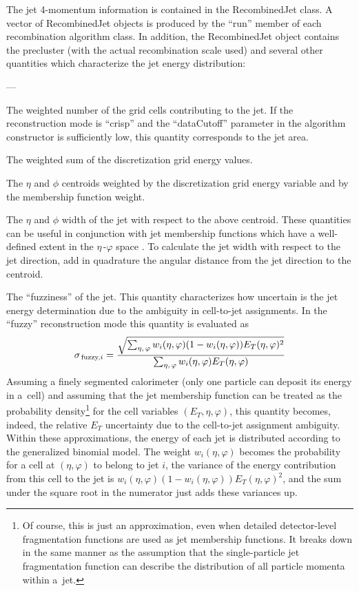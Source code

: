 \documentclass[epsf,12pt,titlepage]{article}
\newcommand{\sub}[1]{\ensuremath{_{\mbox{\scriptsize \,#1}}}}
\def\epspace {$\eta$\,-$\varphi$ space }
\newcommand{\cname}[1]{\index{#1}\textsf{#1}}
\newenvironment{thinlist} {
    \begin{list} {---} {
        \setlength{\topsep}{0.075cm}
        \setlength{\parsep}{0.075cm}
        \setlength{\itemsep}{0.075cm}
    }
} {\end{list}}
\begin{document}
The jet 4-momentum information is contained in the
\cname{RecombinedJet} class. A vector of \cname{RecombinedJet}
objects is produced by the ``run'' member of each recombination
algorithm class. In addition, the \cname{RecombinedJet} object contains
the precluster (with the actual recombination scale used) and
several other quantities which characterize the jet energy
distribution:
\begin{thinlist}
\item The weighted number of the grid cells contributing to the jet. 
      If the reconstruction mode is ``crisp'' and the ``dataCutoff''
      parameter in the algorithm constructor is sufficiently low,
      this quantity corresponds to the jet area.
\item The weighted sum of the discretization grid energy values.
\item The $\eta$ and $\phi$ centroids weighted by the discretization
      grid energy variable and by the membership function weight.
\item The $\eta$ and $\phi$ width of the jet with respect to the
      above centroid. These quantities can be useful in conjunction
      with jet membership functions which have a well-defined extent
      in the \epspace\!\!. To calculate the jet width with respect
      to the jet direction, add in quadrature the angular distance from the
      jet direction to the centroid.
\item The ``fuzziness'' of the jet. This quantity characterizes
      how uncertain is the jet energy determination
      due to the ambiguity in cell-to-jet
      assignments. In the ``fuzzy'' reconstruction mode this quantity
      is evaluated as
      $$
      \sigma\sub{fuzzy,$i$} = \frac{\sqrt{\sum_{\eta, \, \varphi} w_i(\eta, \varphi)(1 - w_i(\eta, \varphi)) E_{T}(\eta, \varphi)^2}}{\sum_{\eta, \, \varphi} w_i(\eta, \varphi) E_{T}(\eta, \varphi)}
      $$
      Assuming a finely segmented calorimeter (only one
      particle can deposit its energy in a~cell) and assuming
      that the jet membership function can be treated as
      the probability density\footnote{Of course, this is just
      an approximation, even when detailed detector-level fragmentation
      functions are used as jet membership functions.
      It breaks down in the same manner as
      the assumption that the single-particle
      jet fragmentation function can describe the distribution of all particle
      momenta within a~jet.}
      for the cell variables $(E_{T}, \eta, \varphi)$, this quantity
      becomes, indeed, the relative $E_{T}$ uncertainty due
      to the cell-to-jet assignment ambiguity. 
      Within these approximations,
      the energy of each jet is distributed according to the
      generalized binomial model.
      The weight $w_i(\eta, \varphi)$ becomes the probability
      for a cell at $(\eta, \varphi)$ to belong to jet $i$,
      the variance of the energy contribution from this
      cell to the jet is $w_i(\eta, \varphi)(1 - w_i(\eta, \varphi)) E_{T}(\eta, \varphi)^2$, and the sum under the square root in the numerator just adds these
      variances up.


\end{thinlist}
\end{document}
